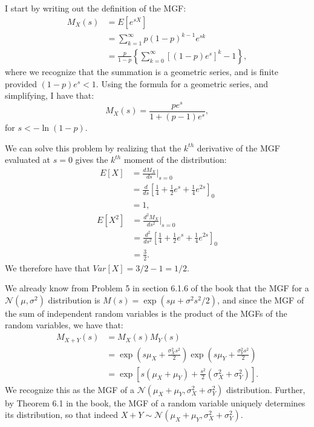 \begin{problem}{6} I start by writing out the definition of the MGF:
\begin{align*}
M_X(s) & = E[e^{sX}] \\
& = \sum_{k=1}^\infty p(1-p)^{k-1} e^{sk}\\
&= \frac{p}{1-p}\left  \{\sum_{k=0}^\infty[(1-p)e^{s}]^k-1\right \},
\end{align*}
where we recognize that the summation is a geometric series, and is finite provided $(1-p)e^{s}<1$.  Using the formula for a geometric series, and simplifying, I have that:
\begin{equation*}
M_X(s) =\frac{pe^{s}}{1+(p-1)e^s},
\end{equation*}
for $s< -\ln(1-p).$


\end{problem}

\begin{problem}{7}  We can solve this problem by realizing that the $k^{th}$ derivative of the MGF evaluated at $s=0$ gives the $k^{th}$ moment of the distribution:
\begin{align*}
E[X] &= \frac{dM_X}{ds}\Big |_{s=0} \\
&= \frac{d}{ds} \left [ \frac{1}{4}+\frac{1}{2}e^s+\frac{1}{4}e^{2s} \right]_0 \\
& = 1,
\end{align*}
\begin{align*}
E[X^2] &= \frac{d^2M_X}{ds^2}\Big |_{s=0} \\
&= \frac{d^2}{ds^2} \left [ \frac{1}{4}+\frac{1}{2}e^s+\frac{1}{4}e^{2s} \right]_0 \\
& = \frac{3}{2}.
\end{align*}
We therefore have that $Var[X] = 3/2-1 = 1/2.$

\end{problem}

\begin{problem}{8}  We already know from Problem 5 in section 6.1.6 of the book that the MGF for a $\mathcal N(\mu, \sigma^2)$ distribution is $M(s) = \exp ( s\mu +\sigma^2 s^2/2 )$, and since the MGF of the sum of independent random variables is the product of the MGFs of the random variables, we have that:
\begin{align*}
M_{X+Y}(s) &= M_X(s)M_Y(s) \\
&=\exp \left(s\mu_X+\frac{\sigma_X^2 s^2}{2} \right)\exp \left(s\mu_Y+\frac{\sigma_Y^2 s^2}{2} \right) \\
& = \exp \left[s(\mu_X+\mu_Y)+\frac{s^2}{2}(\sigma_X^2+\sigma_Y^2) \right].
\end{align*}
We recognize this as the MGF of a $\mathcal N(\mu_X+\mu_Y, \sigma_X^2+\sigma_Y^2)$ distribution.  Further, by Theorem 6.1 in the book, the MGF of a random variable uniquely determines its distribution, so that indeed $X+Y \sim \mathcal N(\mu_X+\mu_Y, \sigma_X^2+ \sigma_Y^2)$.

\end{problem}


